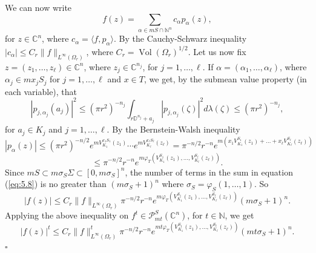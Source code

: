 \documentclass[a4paper,12pt,leqno,english]{article}
\numberwithin{equation}{section}
\newenvironment{proof}{\medbreak\noindent{\bf  Proof:}\rm}{\hfill$\square$\rm}
\begin{document}
\begin{proof}
We can now write
\begin{equation}
\label{eq:5.8}
    f(z)
    =
    \sum_{\alpha \in mS \cap \mathbb{N}^n}
        c_\alpha p_\alpha(z),
\end{equation}
for $z \in \mathbb{C}^n$, where $c_\alpha = \langle f, p_\alpha \rangle$.
By the Cauchy-Schwarz inequality $|c_\alpha| \leq C_r \|f\|_{L^\infty(\Omega_r)}$,
    where $C_r = \operatorname{Vol}(\Omega_r)^{1/2}$.
Let us now fix $z = (z_1, \dots, z_\ell) \in \mathbb{C}^n$, where $z_j \in \mathbb{C}^{n_j}$, for $j = 1, \dots, \ell$.
If $\alpha = (\alpha_1, \dots, \alpha_\ell)$, where $\alpha_j \in m x_j S_j$ for $j = 1, \dots, \ell$ and $x \in T$, 
    we get, by the submean value property (in each variable), that
\begin{equation*}
    |p_{j, \alpha_j}(a_j)|^2
    \leq
    (\pi r^2)^{-n_j}
        \int_{r\mathbb{D}^{n_j} + a_j} |p_{j, \alpha_j}(\zeta)|^2 d\lambda(\zeta)
    \leq
    (\pi r^2)^{-n_j},
\end{equation*}
for $a_j \in K_j$ and $j = 1, \dots, \ell$.
By the Bernstein-Walsh inequality 
\begin{equation*}
    |p_\alpha(z)|
    \leq
    (\pi r^2)^{-n/2}
        e^{mV^{x_1 S_1}_{K_1}(z_1)}
        \cdots
        e^{mV^{x_\ell S_\ell}_{K_\ell}(z_\ell)}
    =
    \pi^{-n/2} r^{-n}
        e^{m(x_1 V^{S_1}_{K_1}(z_1) + \dots + x_\ell V^{S_\ell}_{K_\ell}(z_\ell))}
\end{equation*}
\begin{equation*}
    \leq
    \pi^{-n/2} r^{-n}
        e^{m\varphi_T(V^{S_1}_{K_1}(z_1), \dots, V^{S_\ell}_{K_\ell}(z_\ell))}.
\end{equation*}
Since $mS \subset m \sigma_S\Sigma \subset [0, m \sigma_S]^n$,
    the number of terms in the sum in equation (\ref{eq:5.8}) is no greater than
    $(m \sigma_S + 1)^n$ where $\sigma_S = \varphi_S(1, \dots, 1)$.
So
\begin{equation}
\label{eq:5.10}
    |f(z)|
    \leq
    C_r \|f\|_{L^\infty(\Omega_r)}
        \pi^{-n/2} r^{-n}
            e^{m\varphi_T(V^{S_1}_{K_1}(z_1), \dots, V^{S_\ell}_{K_\ell}(z_\ell))}
        (m \sigma_S + 1)^n.
\end{equation}
Applying the above inequality on $f^t \in \mathcal{P}^S_{mt}(\mathbb{C}^n)$, for $t \in \mathbb{N}$, we get
\begin{equation*}
    |f(z)|^t
    \leq
    C_r \|f\|_{L^\infty(\Omega_r)}^t
        \pi^{-n/2} r^{-n}
            e^{mt \varphi_T(V^{S_1}_{K_1}(z_1), \dots, V^{S_\ell}_{K_\ell}(z_\ell))}
        (mt \sigma_S + 1)^n.

\end{equation*}
\end{proof}
\end{document}
